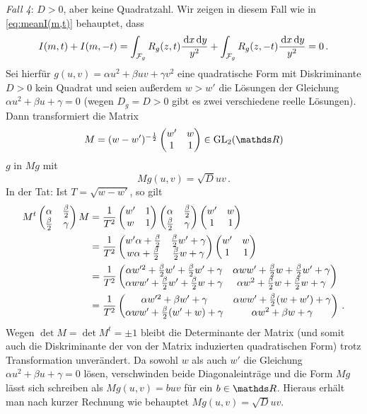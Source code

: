 \begin{bewe}
\emph{Fall 4}: $D > 0$, aber keine Quadratzahl. Wir zeigen in diesem Fall wie in \eqref{eq:meanI(m,t)} behauptet, dass
\[
	I(m,t) + I(m,-t) = \int_{\mathcal{F}_g} R_g (z, t) \frac {\,\mathrm{d} x \,\mathrm{d} y}{y^2} + \int_{\mathcal{F}_g} R_g (z, -t) \frac {\,\mathrm{d} x \,\mathrm{d} y}{y^2} = 0
	\,.
\]
Sei hierfür $g(u, v) = \alpha u^2 + \beta uv + \gamma v^2$ eine quadratische Form mit Diskriminante $D > 0$ kein Quadrat und seien außerdem $w > w'$ die Lösungen der Gleichung $\alpha u^2 + \beta u + \gamma = 0$ (wegen $D_g = D > 0$ gibt es zwei verschiedene reelle Lösungen). Dann transformiert die Matrix
\[
	M = (w - w')^{- \frac 12} \mymat*{w'}w11 \in \GL_2(\RR)
\]
$g$ in $Mg$ mit
\[
	M g(u, v) = \sqrt{D} uv
	\,.
\]
In der Tat: Ist $T = \sqrt{w-w'}$, so gilt
\begin{align*}
	M^t \mymat*{\alpha}{\frac \beta 2}{\frac \beta 2}{\gamma} M 
	&= \frac{1}{T^2} \mymat*{w'}1w1 \mymat*{\alpha}{\frac \beta 2}{\frac \beta 2}{\gamma} \mymat*{w'}w11 \\
	&= \frac{1}{T^2} \mymat*{w' \alpha + \frac \beta 2}{\frac \beta 2 w' + \gamma}{w \alpha + \frac \beta 2}{\frac \beta 2 w + \gamma} \mymat*{w'}w11 \\
	&= \frac{1}{T^2} \mymat*{\alpha w'^2 + \frac \beta 2 w' + \frac \beta 2 w' + \gamma}{\alpha ww' + \frac \beta 2 w + \frac \beta 2 w' + \gamma}{\alpha ww' + \frac \beta 2 w' + \frac \beta 2 w + \gamma}{\alpha w^2 + \frac \beta 2 w + \frac \beta 2 w + \gamma} \\
	&= \frac{1}{T^2} \mymat*{\alpha w'^2 + \beta w' + \gamma}{\alpha ww' + \frac \beta 2 (w + w') + \gamma}{\alpha ww' + \frac \beta 2 (w' + w) + \gamma}{\alpha w^2 + \beta w + \gamma}
	\,.
\end{align*}
Wegen $\det M = \det M^t = \pm 1$ bleibt die Determinante der Matrix (und somit auch die Diskriminante der von der Matrix induzierten quadratischen Form) trotz Transformation unverändert. Da sowohl $w$ als auch $w'$ die Gleichung $\alpha u^2 + \beta u + \gamma = 0$ lösen, verschwinden beide Diagonaleinträge und die Form $Mg$ lässt sich schreiben als $Mg(u, v) = b uv$ für ein $b \in \RR$. Hieraus erhält man nach kurzer Rechnung wie behauptet $Mg(u, v) = \sqrt D uv$.


\end{bewe}
